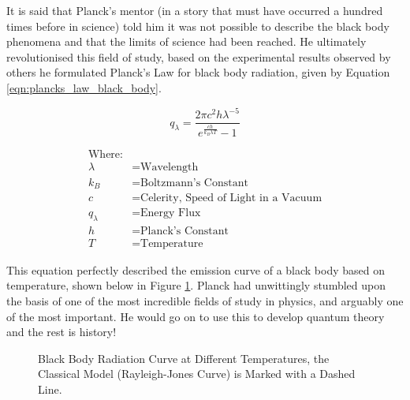 \documentclass[../../Quantum-Technologies-Notes]{subfiles}
\begin{document}
			
			It is said that Planck's mentor (in a story that must have occurred a hundred times before in science) told him it was not possible to describe the black body phenomena and that the limits of science had been reached. He ultimately revolutionised this field of study, based on the experimental results observed by others he formulated Planck's Law for black body radiation, given by Equation \ref{eqn:plancks_law_black_body}.\linebreak
			
			\begin{paracol}{2}
				
				\fontsize{14pt}{15pt}\selectfont
				
				\begin{equation}
					q_{\lambda} = \frac{2\pi c^2 h \lambda^{-5}}{e^{\frac{ch}{k_B \lambda T}}-1}
					\label{eqn:plancks_law_black_body}
				\end{equation}
				
				\switchcolumn
				
				\fontsize{11pt}{12pt}\selectfont
				
				\vspace{-10mm}
				\begin{align*}
					\text{Where:}& \\
					\lambda &= \text{Wavelength} \\
					k_B &= \text{Boltzmann's Constant} \\
					c &= \text{Celerity, Speed of Light in a Vacuum} \\
					q_{\lambda} &= \text{Energy Flux} \\
					\Planckconst &= \text{Planck's Constant} \\
					T &= \text{Temperature}
				\end{align*}
				
			\end{paracol}
			
			This equation perfectly described the emission curve of a black body based on temperature, shown below in Figure \ref{fig:curve_black_body_radiation}. Planck had unwittingly stumbled upon the basis of one of the most incredible fields of study in physics, and arguably one of the most important. He would go on to use this to develop quantum theory and the rest is history! \linebreak
			
			\begin{figure}[!h]
				\centering
				
				\caption{Black Body Radiation Curve at Different Temperatures, the Classical Model (Rayleigh-Jones Curve) is Marked with a Dashed Line.}
				\label{fig:curve_black_body_radiation}
			\end{figure}
\end{document}
